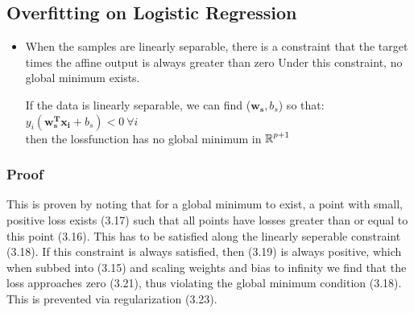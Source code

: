 \documentclass[english]{latex4ei/latex4ei_sheet}
\begin{document}
\begin{sectionbox}
\subsection{Overfitting on Logistic Regression}
\begin{itemize}
\item When the samples are linearly separable, there is a constraint that the target times the affine output is always greater than zero Under this constraint, no global minimum exists.
\begin{emphbox}
    If the data is linearly separable, we can find ($\boldsymbol{w_s},b_s$) so that: $y_i(\boldsymbol{w_s^Tx_i}+b_s)<0 \ \forall i$\\
    then the lossfunction has no global minimum in $\operatorname{\mathbb R}^{p+1}$
\end{emphbox}
\end{itemize}

\subsubsection{Proof}
This is proven by noting that for a global minimum to exist, a point with small, positive loss exists (3.17) such that all points have losses greater than or equal to this point (3.16). This has to be satisfied along the linearly seperable constraint (3.18). If this constraint is always satisfied, then (3.19) is always positive, which when subbed into (3.15) and scaling weights and bias to infinity we find that the loss approaches zero (3.21), thus violating the global minimum condition (3.18). This is prevented via regularization (3.23).
\end{sectionbox}
\end{document}
